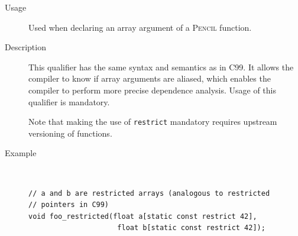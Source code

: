\documentclass{carp}
\renewcommand{\todo}[1]{}
\newcommand\pencil{\textsc{Pencil}\xspace}
\begin{document}
\begin{description}

\item[Usage] Used when declaring an array argument of a \pencil function.

\item[Description] This qualifier has the same syntax and semantics
  as in C99.
  It allows the compiler to know if array
  arguments are aliased, which enables the compiler to
  perform more precise dependence analysis.
  Usage of this qualifier is mandatory.
  
  Note that making the use of \lstinline!restrict! mandatory requires
  upstream versioning of functions.

\item[Example]~
  \begin{lstlisting}[language=pencil]
// a and b are restricted arrays (analogous to restricted
// pointers in C99)
void foo_restricted(float a[static const restrict 42],
                     float b[static const restrict 42]);
  \end{lstlisting}
\end{description}

\todo{Perhaps we should make an exception for
  dynamic memory allocation.  In that case, the allocated address
  should be held in a pointer-to-array type, not a
  pointer-to-scalar/struct type in order to preserve size information.
  An old revision (svn r552) of this document has an example, but the
  details are still in the works.}

%
%
%
%
\end{document}
